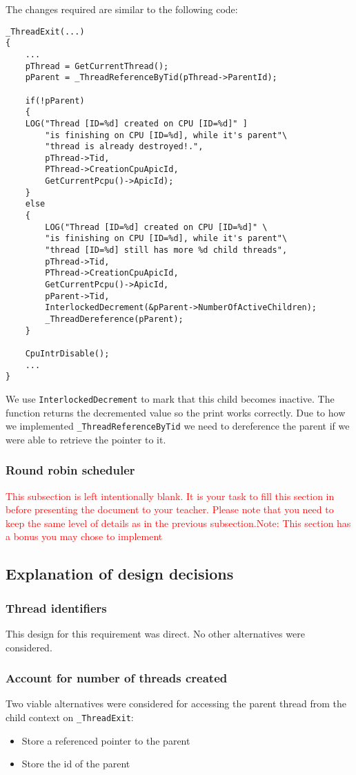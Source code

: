 The changes required are similar to the following code:
\begin{lstlisting}
_ThreadExit(...)
{
    ...
    pThread = GetCurrentThread();
    pParent = _ThreadReferenceByTid(pThread->ParentId);

    if(!pParent)
    {
    LOG("Thread [ID=%d] created on CPU [ID=%d]" ]
        "is finishing on CPU [ID=%d], while it's parent"\
        "thread is already destroyed!.",
        pThread->Tid,
        PThread->CreationCpuApicId,
        GetCurrentPcpu()->ApicId);
    }
    else
    {
        LOG("Thread [ID=%d] created on CPU [ID=%d]" \
        "is finishing on CPU [ID=%d], while it's parent"\
        "thread [ID=%d] still has more %d child threads",
        pThread->Tid,
        PThread->CreationCpuApicId,
        GetCurrentPcpu()->ApicId,
        pParent->Tid,
        InterlockedDecrement(&pParent->NumberOfActiveChildren);
        _ThreadDereference(pParent);
    }

    CpuIntrDisable();
    ...
}
\end{lstlisting}
 
We use \lstinline|InterlockedDecrement| to mark that this child becomes inactive. The function returns the decremented value so the print works correctly.
Due to how we implemented \lstinline |_ThreadReferenceByTid| we need to dereference the parent if we were able to retrieve the pointer to it.


\subsubsection{Round robin scheduler}
  \textcolor{red}{This subsection is left intentionally blank. It is your task to fill this section in before presenting the document to your teacher. Please note that you need to keep the same level of details as in the previous subsection.Note: This section has a bonus you may chose to implement } 
 
\subsection{Explanation of design decisions}
 \subsubsection{Thread identifiers}
 This design for this requirement was direct. No other alternatives were considered.
 
 \subsubsection{Account for number of threads created} 
 Two viable alternatives were considered for accessing the parent thread from the child context on \lstinline|_ThreadExit|:
 \begin{itemize}
     \item Store a referenced pointer to the parent
     \item Store the id of the parent
 \end{itemize}
 
